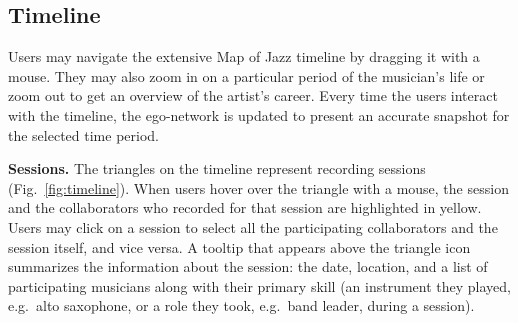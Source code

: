 \documentclass[12pt]{cmuthesis}
\begin{document}

  \subsection{Timeline}

  Users may navigate the extensive Map of Jazz timeline by dragging it with a
  mouse. They may also zoom in on a particular period of the musician's life or
  zoom out to get an overview of the artist's career. Every time the users
  interact with the timeline, the ego-network is updated to present an accurate
  snapshot for the selected time period.

  \textbf{Sessions.} The triangles on the timeline represent recording sessions
  (Fig.~\ref{fig:timeline}). When users hover
  over the triangle with a mouse, the session and the collaborators who recorded for
  that session are highlighted in yellow. Users may click on a session to select
  all the participating collaborators and the session itself, and vice versa. A
  tooltip that appears above the triangle icon
  summarizes the information about the session: the date, location, and
  a list of participating musicians along with their primary skill (an instrument
  they played, e.g.~alto saxophone, or a role they took, e.g.~band leader, during
  a session).
\end{document}
